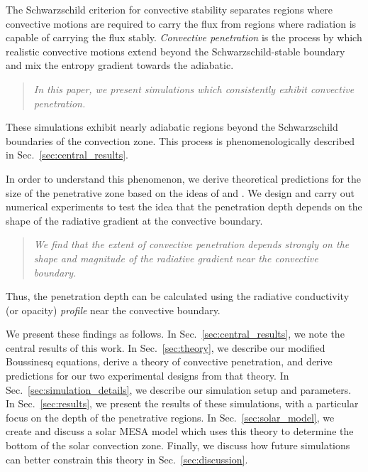 \documentclass[twocolumn]{aastex631}
\begin{document}
The Schwarzschild criterion for convective stability separates regions where convective motions are required to carry the flux from regions where radiation is capable of carrying the flux stably.
\emph{Convective penetration} is the process by which realistic convective motions extend beyond the Schwarzschild-stable boundary and mix the entropy gradient towards the adiabatic.
\begin{quote}
\emph{
In this paper, we present simulations which consistently exhibit convective penetration.
}
\end{quote}
These simulations exhibit nearly adiabatic regions beyond the Schwarzschild boundaries of the convection zone.
This process is phenomenologically described in Sec.~\ref{sec:central_results}.

In order to understand this phenomenon, we derive theoretical predictions for the size of the penetrative zone based on the ideas of \citet{roxburgh1989} and \citet{zahn1991}.
We design and carry out numerical experiments to test the idea that the penetration depth depends on the shape of the radiative gradient at the convective boundary.
\begin{quote}
\emph{
We find that the extent of convective penetration depends strongly on the shape and magnitude of the radiative gradient near the convective boundary.
}
\end{quote}
Thus, the penetration depth can be calculated using the radiative conductivity (or opacity) \emph{profile} near the convective boundary.

We present these findings as follows.
In Sec.~\ref{sec:central_results}, we note the central results of this work.
In Sec.~\ref{sec:theory}, we describe our modified Boussinesq equations, derive a theory of convective penetration, and derive predictions for our two experimental designs from that theory.
In Sec.~\ref{sec:simulation_details}, we describe our simulation setup and parameters.
In Sec.~\ref{sec:results}, we present the results of these simulations, with a particular focus on the depth of the penetrative regions.
In Sec.~\ref{sec:solar_model}, we create and discuss a solar MESA model which uses this theory to determine the bottom of the solar convection zone.
Finally, we discuss how future simulations can better constrain this theory in Sec.~\ref{sec:discussion}.
\end{document}
